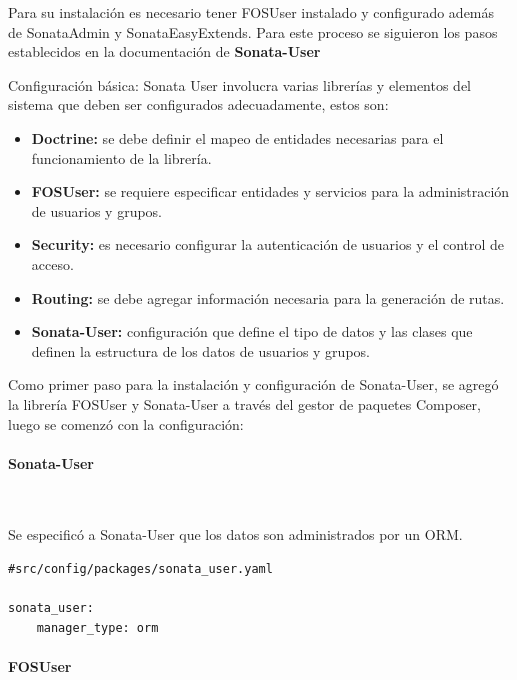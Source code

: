 Para su instalación es necesario tener FOSUser instalado y configurado además de SonataAdmin y SonataEasyExtends\@.
Para este proceso se siguieron los pasos establecidos en la documentación de \textbf{Sonata-User}~\textcite{sonata-user}

Configuración básica: Sonata User involucra varias librerías y elementos del sistema que deben ser configurados adecuadamente, estos son:

\begin{itemize}
    \item \textbf{Doctrine:} se debe definir el mapeo de entidades necesarias para el funcionamiento de la librería.
    \item \textbf{FOSUser:} se requiere especificar entidades y servicios para la administración de usuarios y grupos.
    \item \textbf{Security:} es necesario configurar la autenticación de usuarios y el control de acceso.
    \item \textbf{Routing:} se debe agregar información necesaria para la generación de rutas.
    \item \textbf{Sonata-User:} configuración que define el tipo de datos y las clases que definen la estructura de los datos de usuarios y grupos.
\end{itemize}



Como primer paso para la instalación y configuración de Sonata-User, se agregó la librería FOSUser y Sonata-User a través del gestor de paquetes Composer,
luego se comenzó con la configuración:

\paragraph{Sonata-User}~\newline

Se especificó a Sonata-User que los datos son administrados por un ORM.

\begin{lstlisting}[caption=archivo de configuración de sonata-user]
#src/config/packages/sonata_user.yaml

sonata_user:
    manager_type: orm

\end{lstlisting}

\paragraph{FOSUser}~\newline

